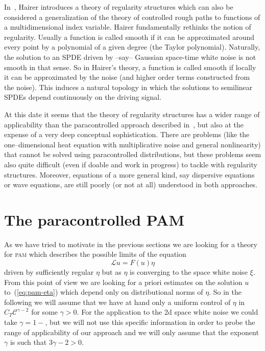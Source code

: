 \documentclass[a4paper,11pt]{article}
\newcommand{\tmname}[1]{\textsc{#1}}
\newcommand{\LL}{\mathscr{L}}
\newcommand{\CC}{\mathscr{C}}
\begin{document}
In~{\cite{Hairer2014}}, Hairer introduces a theory of regularity structures
which can also be considered a generalization of the theory of controlled
rough paths to functions of a multidimensional index variable. Hairer
fundamentally rethinks the notion of regularity. Usually a function is called
smooth if it can be approximated around every point by a polynomial of a given
degree (the Taylor polynomial). Naturally, the solution to an SPDE driven by
--say-- Gaussian space-time white noise is not smooth in that sense. So in
Hairer's theory, a function is called smooth if locally it can be approximated
by the noise (and higher order terms constructed from the noise). This induces
a natural topology in which the solutions to semilinear SPDEs depend
continuously on the driving signal.

At this date it seems that the theory of regularity structures has a wider
range of applicability than the paracontrolled approach described
in~{\cite{Gubinelli2012}}, but also at the expense of a very deep conceptual
sophistication. There are problems (like the one--dimensional heat equation
with multiplicative noise and general nonlinearity) that cannot be solved
using paracontrolled distributions, but these problems seem also quite
difficult (even if doable and work in progress) to tackle with regularity
structures. Moreover, equations of a more general kind, say dispersive
equations or wave equations, are still poorly (or not at all) understood in
both approaches.

\section{The paracontrolled PAM}

As we have tried to motivate in the previous sections we are looking for a
theory for {\tmname{pam}} which describes the possible limits of the equation
\begin{equation}
  \LL u = F (u) \eta \label{eq:pam-eta}
\end{equation}
driven by sufficiently regular $\eta$ but as $\eta$ is converging to the space
white noise $\xi$. From this point of view we are looking for a priori
estimates on the solution $u$ to~(\ref{eq:pam-eta}) which depend only on
distributional norms of $\eta$. So in the following we will assume that we
have at hand only a uniform control of $\eta$ in $C_T \CC^{\gamma - 2}$ for
some $\gamma > 0$. For the application to the 2d space white noise we could
take $\gamma = 1 -$, but we will not use this specific information in order to
probe the range of applicability of our approach and we will only assume that
the exponent $\gamma$ is such that $3 \gamma - 2 > 0$.
\end{document}
